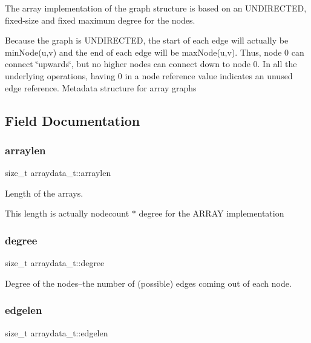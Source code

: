 The array implementation of the graph structure is based on an U\+N\+D\+I\+R\+E\+C\+T\+ED, fixed-\/size and fixed maximum degree for the nodes.

Because the graph is U\+N\+D\+I\+R\+E\+C\+T\+ED, the start of each edge will actually be min\+Node(u,v) and the end of each edge will be max\+Node(u,v). Thus, node 0 can connect \char`\"{}upwards\char`\"{}, but no higher nodes can connect down to node 0. In all the underlying operations, having 0 in a node reference value indicates an unused edge reference. Metadata structure for array graphs 

\subsection{Field Documentation}
\mbox{\label{structarraydata__t_a2a07b4b41c935e1a5acba14d3df92a45}} 
\subsubsection{\texorpdfstring{arraylen}{arraylen}}
{\footnotesize\ttfamily size\+\_\+t arraydata\+\_\+t\+::arraylen}



Length of the arrays. 

This length is actually nodecount $\ast$ degree for the A\+R\+R\+AY implementation \mbox{\label{structarraydata__t_af48476cee5ba6969a23157f07788f304}} 
\subsubsection{\texorpdfstring{degree}{degree}}
{\footnotesize\ttfamily size\+\_\+t arraydata\+\_\+t\+::degree}



Degree of the nodes--the number of (possible) edges coming out of each node. 

\mbox{\label{structarraydata__t_a1bcdcd2b541e02eb0d20be0563a1f447}} 
\subsubsection{\texorpdfstring{edgelen}{edgelen}}
{\footnotesize\ttfamily size\+\_\+t arraydata\+\_\+t\+::edgelen}



